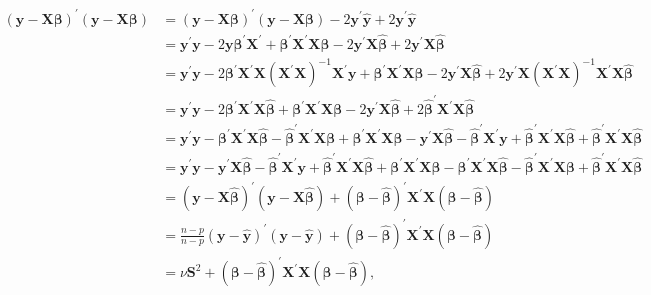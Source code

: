 \documentclass[12pt, oldfontcommands]{article}\usepackage[]{graphicx}\usepackage[]{color}
\begin{document}
\begin{align*}
 (\mathbf{y} - \mathbf{X} \bm{\beta})^{'}
 (\mathbf{y} - \mathbf{X} \bm{\beta}) & =
 (\mathbf{y} - \mathbf{X} \bm{\beta})^{'}
 (\mathbf{y} - \mathbf{X} \bm{\beta})
 - 2\mathbf{y}^{'}\hat{\mathbf{y}} + 2\mathbf{y}^{'}\hat{\mathbf{y}} \\
 & = \mathbf{y}^{'}\mathbf{y} - 2\mathbf{y}\bm{\beta}^{'}\mathbf{X}^{'}
     + \bm{\beta}^{'}\mathbf{X}^{'}\mathbf{X}\bm{\beta}
     - 2\mathbf{y}^{'}\mathbf{X}\hat{\bm{\beta}}
     + 2\mathbf{y}^{'}\mathbf{X}\hat{\bm{\beta}} \\ & =
 \mathbf{y}^{'}\mathbf{y} - 2\bm{\beta}^{'}\mathbf{X}^{'}
 \mathbf{X}(\mathbf{X}^{'}\mathbf{X})^{-1}\mathbf{X}^{'}\mathbf{y}
 + \bm{\beta}^{'}\mathbf{X}^{'}\mathbf{X}\bm{\beta}
 - 2\mathbf{y}^{'}\mathbf{X}\hat{\bm{\beta}}
 + 2\mathbf{y}^{'}\mathbf{X}
 (\mathbf{X}^{'}\mathbf{X})^{-1}\mathbf{X}^{'}\mathbf{X}\hat{\bm{\beta}}
 \\ & = \mathbf{y}^{'}\mathbf{y}
        - 2\bm{\beta}^{'}\mathbf{X}^{'}\mathbf{X}\hat{\bm{\beta}}
        + \bm{\beta}^{'}\mathbf{X}^{'}\mathbf{X}\bm{\beta}
        - 2\mathbf{y}^{'}\mathbf{X}\hat{\bm{\beta}}
        + 2\hat{\bm{\beta}}^{'}\mathbf{X}^{'}\mathbf{X}\hat{\bm{\beta}}
 \\ & = \mathbf{y}^{'}\mathbf{y}
        - \bm{\beta}^{'}\mathbf{X}^{'}\mathbf{X}\hat{\bm{\beta}}
        - \hat{\bm{\beta}}^{'}\mathbf{X}^{'}\mathbf{X}\bm{\beta}
        + \bm{\beta}^{'}\mathbf{X}^{'}\mathbf{X}\bm{\beta}
        - \mathbf{y}^{'}\mathbf{X}\hat{\bm{\beta}}
        - \hat{\bm{\beta}}^{'}\mathbf{X}^{'}\mathbf{y}
        + \hat{\bm{\beta}}^{'}\mathbf{X}^{'}\mathbf{X}\hat{\bm{\beta}}
        + \hat{\bm{\beta}}^{'}\mathbf{X}^{'}\mathbf{X}\hat{\bm{\beta}}
 \\ & = \mathbf{y}^{'}\mathbf{y}
        - \mathbf{y}^{'}\mathbf{X}\hat{\bm{\beta}}
        - \hat{\bm{\beta}}^{'}\mathbf{X}^{'}\mathbf{y}
        + \hat{\bm{\beta}}^{'}\mathbf{X}^{'}\mathbf{X}\hat{\bm{\beta}}
        + \bm{\beta}^{'}\mathbf{X}^{'}\mathbf{X}\bm{\beta}
        - \bm{\beta}^{'}\mathbf{X}^{'}\mathbf{X}\hat{\bm{\beta}}
        - \hat{\bm{\beta}}^{'}\mathbf{X}^{'}\mathbf{X}\bm{\beta}
        + \hat{\bm{\beta}}^{'}\mathbf{X}^{'}\mathbf{X}\hat{\bm{\beta}}
 \\ & = (\mathbf{y} - \mathbf{X} \hat{\bm{\beta}})^{'}
        (\mathbf{y} - \mathbf{X} \hat{\bm{\beta}})
        + (\bm{\beta} - \hat{\bm{\beta}})^{'}
          \mathbf{X}^{'}\mathbf{X}(\bm{\beta} - \hat{\bm{\beta}}) \\
 & = \frac{n - p}{n - p}
     (\mathbf{y} - \hat{\mathbf{y}})^{'}(\mathbf{y} - \hat{\mathbf{y}})
     + (\bm{\beta} - \hat{\bm{\beta}})^{'}
       \mathbf{X}^{'}\mathbf{X}(\bm{\beta} - \hat{\bm{\beta}}) \\
 & = \nu \mathbf{S}^{2} + (\bm{\beta} - \hat{\bm{\beta}})^{'}
     \mathbf{X}^{'}\mathbf{X}(\bm{\beta} - \hat{\bm{\beta}}),
\end{align*}
\end{document}
